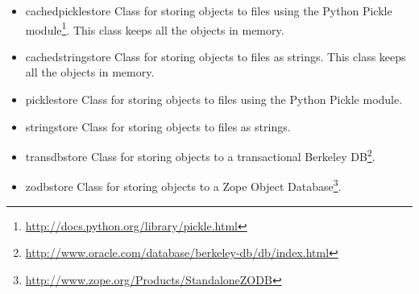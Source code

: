 \documentclass{article}
\begin{document}
\begin{itemize}
\begin{itemize}
    \item{cachedpicklestore\newline
    Class for storing objects to files using the Python Pickle module\footnote{\url{http://docs.python.org/library/pickle.html}}. 
    This class keeps all the objects in memory.
    }

    \item{cachedstringstore\newline
    Class for storing objects to files as strings. This class keeps all the objects in memory.
    }

    \item{picklestore\newline
    Class for storing objects to files using the Python Pickle module.
    }

    \item{stringstore\newline
    Class for storing objects to files as strings.
    }

    \item{transdbstore\newline
    Class for storing objects to a transactional Berkeley DB\footnote{\url{http://www.oracle.com/database/berkeley-db/db/index.html}}.
    }

    \item{zodbstore\newline
    Class for storing objects to a Zope Object Database\footnote{\url{http://www.zope.org/Products/StandaloneZODB}}.
    }

  \end{itemize}

\end{itemize}
\end{document}
